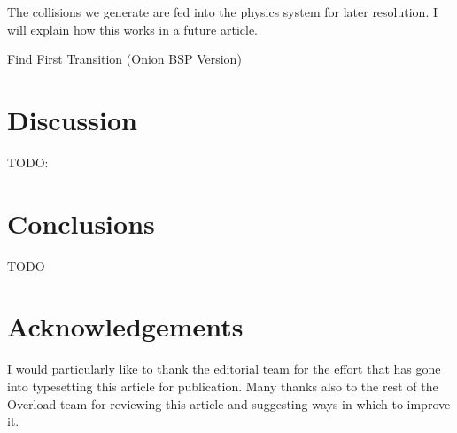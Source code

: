 \documentclass[10pt,twocolumn]{article}
\begin{document}
The collisions we generate are fed into the physics system for later resolution. I will explain how this works in a future article.

\begin{stulisting}[tp]
\caption{Find First Transition (Onion BSP Version)}
\label{code:find-first-transition}

\end{stulisting}

\section{Discussion}
\label{sec:discussion}

TODO: \cite{melax00}

\section{Conclusions}
\label{sec:conclusions}

TODO

\section{Acknowledgements}

I would particularly like to thank the editorial team for the effort that has gone into typesetting this article for publication. Many thanks also to the rest of the Overload team for reviewing this article and suggesting ways in which to improve it.

%
%

\clearpage




\end{document}
